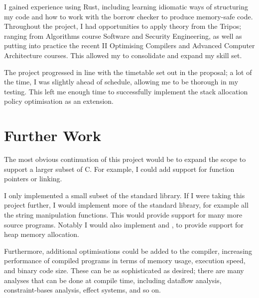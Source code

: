 \documentclass[00-main.tex]{subfiles}
\begin{document}
I gained experience using Rust, including learning idiomatic ways of structuring my code and how to work with the borrow checker to produce memory-safe code.
Throughout the project, I had opportunities to apply theory from the Tripos; ranging from Algorithms course Software and Security Engineering, as well as putting into practice the recent II Optimising Compilers and Advanced Computer Architecture courses.
This allowed my to consolidate and expand my skill set.

The project progressed in line with the timetable set out in the proposal; a lot of the time, I was slightly ahead of schedule, allowing me to be thorough in my testing.
This left me enough time to successfully implement the stack allocation policy optimisation as an extension.

\section{Further Work}

The most obvious continuation of this project would be to expand the scope to support a larger subset of C.
For example, I could add support for function pointers or linking.

I only implemented a small subset of the standard library.
If I were taking this project further, I would implement more of the standard library, for example all the string manipulation functions.
This would provide support for many more source programs.
Notably I would also implement  and , to provide support for heap memory allocation.

Furthermore, additional optimisations could be added to the compiler, increasing performance of compiled programs in terms of memory usage, execution speed, and binary code size.
These can be as sophisticated as desired; there are many analyses that can be done at compile time, including dataflow analysis, constraint-bases analysis, effect systems, and so on.
\end{document}
